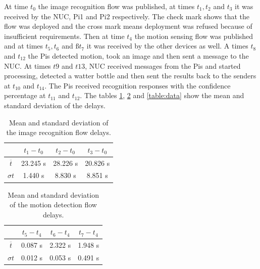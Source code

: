 \noindent At time $t_0$ the image recognition flow was published, at times $t_1, t_2$ and   $t_3$ it was received by the NUC, Pi1 and Pi2 respectively. The check mark shows that the flow was deployed and the cross mark means deployment was refused because of insufficient requirements. Then at time $t_4$ the motion sensing flow was published and at times $t_5,t_6$ and $ßt_7$ it was received by the other devices as well. A times $t_8$ and $t_{12}$  the Pis detected motion, took an image and then sent a message to the NUC. At times $t9$ and $t{13}$,  NUC received messages from the Pis and started processing, detected a watter bottle and then sent the  results back to the senders at $t_{10}$ and $t_{14}$. The Pis received recognition responses with the confidence percentage at $t_{11}$ and $t_{12}$.  The tables \ref{table:tensor}, \ref{table:motion} and \ref{table:data} show the mean and standard deviation of the delays.  
\begin{table}[H]
\centering
\begin{tabular}{c|c|c|c}\toprule
&$t_1 - t_0$  & $t_2 - t_0$  & $t_3-t_0$ \\ \midrule
$ \overline{t} $&	23.245 s&28.226 s&20.826 s\\ 
$ \sigma t $ &1.440 s&8.830 s&8.851 s\\
\end{tabular}
\caption{Mean and standard deviation of the image recognition flow delays.}
\label{table:tensor}
\end{table}


\begin{table}[H]
\centering
\begin{tabular}{c|c|c|c}\toprule
&$t_5 - t_4$  & $t_6 - t_4$  & $t_7-t_4$ \\ \midrule
$ \overline{t} $ &0.087 s&2.322 s&1.948 s\\
$ \sigma t $&0.012 s&0.053 s&0.491 s\\
\end{tabular}
\caption{Mean and standard deviation of the motion detection flow delays.}
\label{table:motion}
\end{table}

